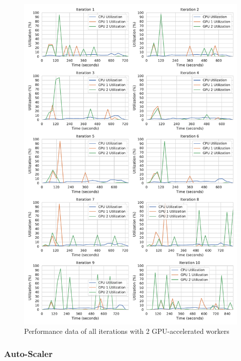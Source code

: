\begin{figure}[h]
\centering
\includegraphics[scale=0.4]{images/07_evaluation/classification/gpu2_performance}
\caption{Performance data of all iterations with 2 GPU-accelerated workers}
\label{fig:appendix_eval_classification_gpu2}
\end{figure}

\subsubsection{Auto-Scaler}

